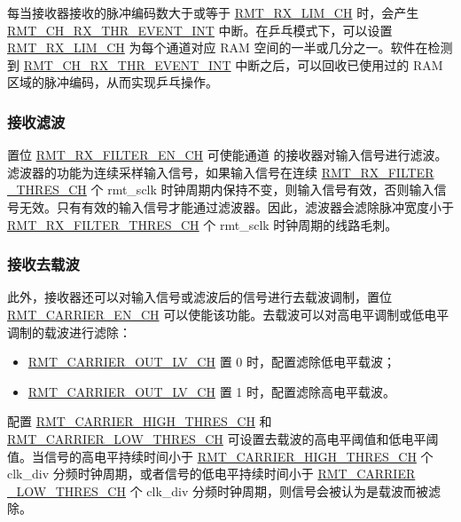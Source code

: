 \documentclass[main\_\_CN.tex]{subfiles}
\begin{document}
每当接收器接收的脉冲编码数大于或等于 \hyperref[fielddesc:RMTRXLIMCHM]{RMT\_RX\_LIM\_CH} 时，会产生
\hyperref[int:RMTCHMRXTHREVENTINT]{RMT\_CH\_RX\_THR\_EVENT\_INT} 中断。在乒乓模式下，可以设置 \hyperref[fielddesc:RMTRXLIMCHM]{RMT\_RX\_LIM\_CH}
为每个通道对应 RAM 空间的一半或几分之一。软件在检测到 \hyperref[int:RMTCHMRXTHREVENTINT]{RMT\_CH\_RX\_THR\_EVENT\_INT}
中断之后，可以回收已使用过的 RAM 区域的脉冲编码，从而实现乒乓操作。


\subsubsection{接收滤波}

置位 \hyperref[fielddesc:RMTRXFILTERENCHM]{RMT\_RX\_FILTER\_EN\_CH} 可使能通道  的接收器对输入信号进行滤波。滤波器的功能为连续采样输入信号，如果输入信号在连续 \hyperref[fielddesc:RMTRXFILTERTHRESCHM]{RMT\_RX\_FILTER \_THRES\_CH} 个 rmt\_sclk 时钟周期内保持不变，则输入信号有效，否则输入信号无效。只有有效的输入信号才能通过滤波器。因此，滤波器会滤除脉冲宽度小于 \hyperref[fielddesc:RMTRXFILTERTHRESCHM]{RMT\_RX\_FILTER\_THRES\_CH} 个 rmt\_sclk 时钟周期的线路毛刺。


\subsubsection{接收去载波}

此外，接收器还可以对输入信号或滤波后的信号进行去载波调制，置位 \hyperref[fielddesc:RMTCARRIERENCHM]{RMT\_CARRIER\_EN\_CH} 可以使能该功能。去载波可以对高电平调制或低电平调制的载波进行滤除：
\begin{itemize}
    \item \hyperref[fielddesc:RMTCARRIEROUTLVCHM]{RMT\_CARRIER\_OUT\_LV\_CH} 置 0 时，配置滤除低电平载波；
    \item \hyperref[fielddesc:RMTCARRIEROUTLVCHM]{RMT\_CARRIER\_OUT\_LV\_CH} 置 1 时，配置滤除高电平载波。
\end{itemize}

配置 \hyperref[fielddesc:RMTCARRIERHIGHTHRESCHM]{RMT\_CARRIER\_HIGH\_THRES\_CH} 和 \hyperref[fielddesc:RMTCARRIERLOWTHRESCHM]{RMT\_CARRIER\_LOW\_THRES\_CH} 可设置去载波的高电平阈值和低电平阈值。当信号的高电平持续时间小于 \hyperref[fielddesc:RMTCARRIERHIGHTHRESCHM]{RMT\_CARRIER\_HIGH\_THRES\_CH} 个 clk\_div 分频时钟周期，或者信号的低电平持续时间小于 \hyperref[fielddesc:RMTCARRIERLOWTHRESCHM]{RMT\_CARRIER \_LOW\_THRES\_CH} 个 clk\_div 分频时钟周期，则信号会被认为是载波而被滤除。
\end{document}
